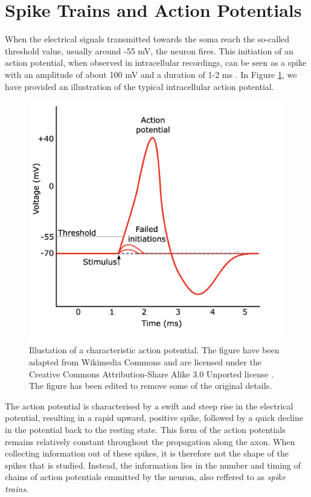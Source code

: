 \documentclass[a4paper, UKenglish, 11pt]{uiomaster}
\begin{document}
\section{Spike Trains and Action Potentials}

When the electrical signals transmitted towards the soma reach the so-called threshold value, usually around -55 mV, the neuron fires. This initiation of an action potential, when observed in intracellular recordings, can be seen as a spike with an amplitude of about 100 mV and a duration of 1-2 ms \cite{gerstner2014neuronal}. In Figure \ref{fig:action_potential}, we have provided an illustration of the typical intracellular action potential.


\begin{figure}
    \centering
    \includegraphics[width=0.8\linewidth]{figures/action_potential.png}
    \caption{Illustation of a characteristic action potential. The figure have been adapted from Wikimedia Commons and are licensed under the Creative Commons Attribution-Share Alike 3.0 Unported license \cite{wikimedia-action}. The figure has been edited to remove some of the original details.}
    \label{fig:action_potential}
\end{figure}

The action potential is characterised by a swift and steep rise in the electrical potential, resulting in a rapid upward, positive spike, followed by a quick decline in the potential back to the resting state. This form of the action potentials remains relatively constant throughout the propagation along the axon. When collecting information out of these spikes, it is therefore not the shape of the spikes that is studied. Instead, the information lies in the number and timing of chains of action potentials emmitted by the neuron, also reffered to as \emph{spike trains}.
\end{document}
